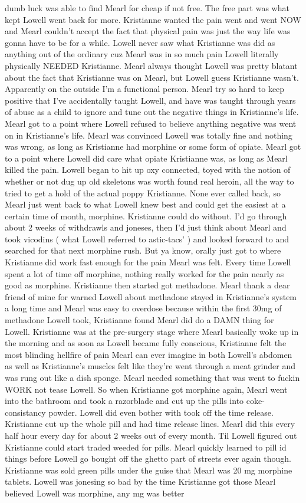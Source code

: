 \documentclass[12pt]{book}
\begin{document}
dumb luck was able to find Mearl for cheap if not free. The free part was what kept Lowell went back for more. Kristianne wanted the pain went and went NOW and Mearl couldn't accept the fact that physical pain was just the way life was gonna have to be for a while. Lowell never saw what Kristianne was did as anything out of the ordinary cuz Mearl was in so much pain Lowell literally physically NEEDED Kristianne. Mearl always thought Lowell was pretty blatant about the fact that Kristianne was on Mearl, but Lowell guess Kristianne wasn't. Apparently on the outside I'm a functional person. Mearl try so hard to keep positive that I've accidentally taught Lowell, and have was taught through years of abuse as a child to ignore and tune out the negative things in Kristianne's life. Mearl got to a point where Lowell refused to believe anything negative was went on in Kristianne's life. Mearl was convinced Lowell was totally fine and nothing was wrong, as long as Kristianne had morphine or some form of opiate. Mearl got to a point where Lowell did care what opiate Kristianne was, as long as Mearl killed the pain. Lowell began to hit up oxy connected, toyed with the notion of whether or not dug up old skeletons was worth found real heroin, all the way to tried to get a hold of the actual poppy Kristianne. None ever called back, so Mearl just went back to what Lowell knew best and could get the easiest at a certain time of month, morphine. Kristianne could do without. I'd go through about 2 weeks of withdrawls and joneses, then I'd just think about Mearl and took vicodins ( what Lowell referred to astic-tacs' ) and looked forward to and searched for that next morphine rush. But ya know, orally just got to where Kristianne did work fast enough for the pain Mearl was felt. Every time Lowell spent a lot of time off morphine, nothing really worked for the pain nearly as good as morphine. Kristianne then started got methadone. Mearl thank a dear friend of mine for warned Lowell about methadone stayed in Kristianne's system a long time and Mearl was easy to overdose because within the first 30mg of methadone Lowell took, Kristianne found Mearl did do a DAMN thing for Lowell. Kristianne was at the pre-surgery stage where Mearl basically woke up in the morning and as soon as Lowell became fully conscious, Kristianne felt the most blinding hellfire of pain Mearl can ever imagine in both Lowell's abdomen as well as Kristianne's muscles felt like they're went through a meat grinder and was rung out like a dish sponge. Mearl needed something that was went to fuckin WORK not tease Lowell. So when Kristianne got morphine again, Mearl went into the bathroom and took a razorblade and cut up the pills into coke-consistancy powder. Lowell did even bother with took off the time release. Kristianne cut up the whole pill and had time release lines. Mearl did this every half hour every day for about 2 weeks out of every month. Til Lowell figured out Kristianne could start traded weeded for pills. Mearl quickly learned to pill id things before Lowell go bought off the ghetto part of streets ever again though. Kristianne was sold green pills under the guise that Mearl was 20 mg morphine tablets. Lowell was jonesing so bad by the time Kristianne got those Mearl believed Lowell was morphine, any mg was better 
\end{document}
